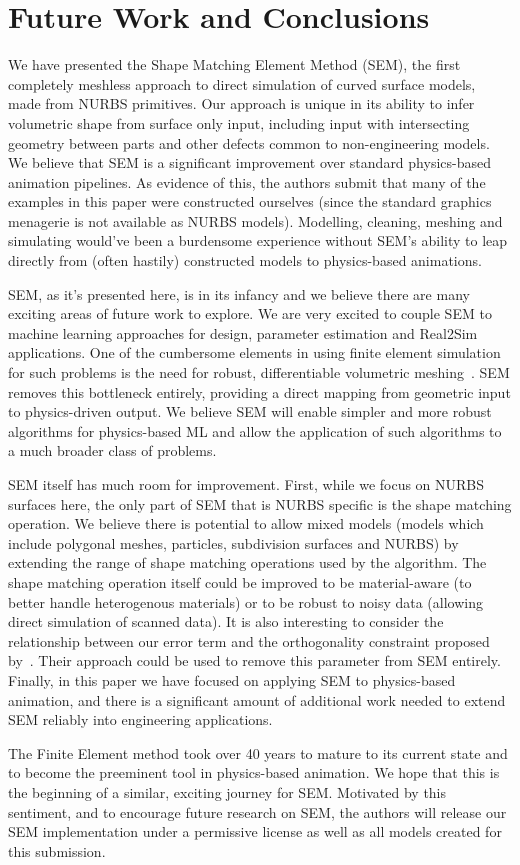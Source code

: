 \section{Future Work and Conclusions}
We have presented the Shape Matching Element Method (SEM), the first completely meshless approach to direct simulation of curved surface models, made from NURBS primitives.
Our approach is unique in its ability to infer volumetric shape from surface only input,
including input with intersecting geometry between parts and other defects common to non-engineering models.
We believe that SEM is a significant improvement over standard physics-based animation pipelines. 
As evidence of this, the authors submit that many of the examples in this paper were constructed ourselves
(since the standard graphics menagerie is not available as NURBS models). 
Modelling, cleaning, meshing and simulating would've been a burdensome experience without SEM's
ability to leap directly from (often hastily) constructed models to physics-based animations.

SEM, as it's presented here, is in its infancy and we believe there are many exciting areas of future work to explore.
We are very excited to couple SEM to machine learning approaches for design, parameter estimation and Real2Sim applications.
One of the cumbersome elements in using finite element simulation for such problems is the need for robust, differentiable volumetric meshing~\cite{gao2020deftet}.
SEM removes this bottleneck entirely, providing a direct mapping from geometric input to physics-driven output. 
We believe SEM will enable simpler and more robust algorithms for  physics-based ML and 
allow the application of such algorithms to a much broader class of problems. 

SEM itself has much room for improvement. 
First, while we focus on NURBS surfaces here, the only part of SEM that is NURBS specific is the shape matching operation.
We believe there is potential to allow mixed models (models which include polygonal meshes, particles, subdivision surfaces and NURBS)
by extending the range of shape matching operations used by the algorithm. The shape matching operation itself could be improved to be material-aware 
(to better handle heterogenous materials) or to be robust to noisy data (allowing direct simulation of scanned data). 
It is also interesting to consider the relationship between our error term and the orthogonality constraint proposed by~\citet{Zhang:CompDynamics:2020}. 
Their approach could be used to remove this parameter from SEM entirely.
Finally, in this paper we have focused on applying SEM to physics-based animation, and there is a significant amount of additional work needed to 
extend SEM reliably into engineering applications.

The Finite Element method took over 40 years to mature to its current state and to become the preeminent tool in physics-based animation.
We hope that this is the beginning of a similar, exciting journey for SEM. 
Motivated by this sentiment, and to encourage future research on SEM, the authors will release our SEM implementation 
under a permissive license as well as all models created for this submission.
